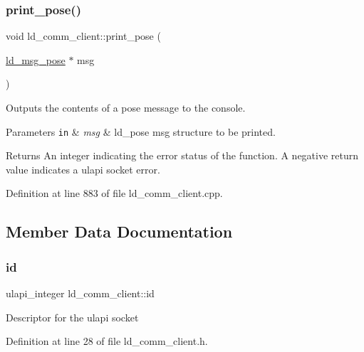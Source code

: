 \subsubsection{\texorpdfstring{print\+\_\+pose()}{print\_pose()}}
{\footnotesize\ttfamily void ld\+\_\+comm\+\_\+client\+::print\+\_\+pose (\begin{DoxyParamCaption}\item[{\mbox{\hyperlink{structld__msg__pose}{ld\+\_\+msg\+\_\+pose}} $\ast$}]{msg }\end{DoxyParamCaption})}

Outputs the contents of a pose message to the console. 
\begin{DoxyParams}[1]{Parameters}
\mbox{\tt in}  & {\em msg} & ld\+\_\+pose msg structure to be printed. \\
\hline
\end{DoxyParams}
\begin{DoxyReturn}{Returns}
An integer indicating the error status of the function. A negative return value indicates a ulapi socket error. 
\end{DoxyReturn}


Definition at line 883 of file ld\+\_\+comm\+\_\+client.\+cpp.



\subsection{Member Data Documentation}
\mbox{\label{classld__comm__client_ae6503fd1049ca849c6d49cf38c56d5aa}} 
\subsubsection{\texorpdfstring{id}{id}}
{\footnotesize\ttfamily ulapi\+\_\+integer ld\+\_\+comm\+\_\+client\+::id\hspace{0.3cm}{\ttfamily [private]}}

Descriptor for the ulapi socket 

Definition at line 28 of file ld\+\_\+comm\+\_\+client.\+h.

\mbox{\label{classld__comm__client_aad5cf14a1d33d95538c31ca525dcc9e4}} 
